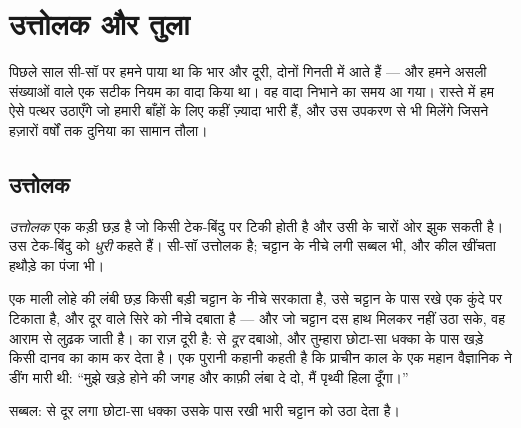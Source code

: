 \chapter{उत्तोलक और तुला}\label{ch:g3:levers-and-scales}

पिछले साल सी-सॉ पर हमने पाया था कि भार और दूरी, दोनों गिनती में आते
हैं --- और हमने असली संख्याओं वाले एक सटीक नियम का वादा किया था। वह
वादा निभाने का समय आ गया। रास्ते में हम ऐसे पत्थर उठाएँगे जो हमारी
बाँहों के लिए कहीं ज़्यादा भारी हैं, और उस उपकरण से भी मिलेंगे जिसने
हज़ारों वर्षों तक दुनिया का सामान तौला।

\section{उत्तोलक}

\begin{definition}[उत्तोलक और धुरी]\label{def:g3:levers-and-scales:lever}
\emph{उत्तोलक} एक कड़ी छड़ है जो किसी टेक-बिंदु पर
टिकी होती है और उसी के चारों ओर झुक सकती है। उस टेक-बिंदु को
\emph{धुरी} कहते हैं। सी-सॉ उत्तोलक है; चट्टान के नीचे
लगी सब्बल भी, और कील खींचता हथौड़े का पंजा भी।
\end{definition}

\begin{example}[ताक़त बढ़ाने वाला]\label{ex:g3:levers-and-scales:crowbar}
एक माली लोहे की लंबी छड़ किसी बड़ी चट्टान के नीचे सरकाता है, उसे
चट्टान के पास रखे एक कुंदे पर टिकाता है, और दूर वाले सिरे को नीचे
दबाता है --- और जो चट्टान दस हाथ मिलकर नहीं उठा सके, वह आराम से लुढ़क
जाती है।  का राज़ दूरी है:  से \emph{दूर} दबाओ, और
तुम्हारा छोटा-सा धक्का  के पास खड़े किसी दानव का काम कर देता है।
एक पुरानी कहानी कहती है कि प्राचीन काल के एक महान वैज्ञानिक ने डींग
मारी थी: ``मुझे खड़े होने की जगह और काफ़ी लंबा  दे दो, मैं
पृथ्वी हिला दूँगा।''
\end{example}

\begin{omfigure}

{\small सब्बल:  से दूर लगा छोटा-सा धक्का उसके पास रखी भारी चट्टान
को उठा देता है।}
\end{omfigure}

